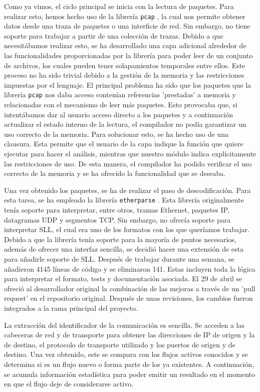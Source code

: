 \documentclass[10pt,a4paper,twoside]{article}
\begin{document}
\begin{multicols*}{2}
    Como ya vimos, el ciclo principal se inicia con la lectura de paquetes. Para realizar esto, hemos hecho uso de la librería \texttt{pcap} \cite{rustpcap}, la cual nos permite obtener datos desde una traza de paquetes o una interficie de red. Sin embargo, no tiene soporte para trabajar a partir de una colección de trazas. Debido a que necesitábamos realizar esto, se ha desarrollado una capa adicional alrededor de las funcionalidades proporcionadas por la librería para poder leer de un conjunto de archivos, los cuales pueden tener solapamientos temporales entre ellos. Este proceso no ha sido trivial debido a la gestión de la memoria y las restricciones impuestas por el lenguaje. El principal problema ha sido que los paquetes que la librería \texttt{pcap} nos daba acceso contenían referencias 'prestadas' a memoria y relacionadas con el mecanismo de leer más paquetes. Esto provocaba que, si intentábamos dar al usuario acceso directo a los paquetes y a continuación actualizar el estado interno de la lectura, el compilador no podía garantizar un uso correcto de la memoria. Para solucionar esto, se ha hecho uso de una clausura. Esta permite que el usuario de la capa indique la función que quiere ejecutar para hacer el análisis, mientras que nuestro módulo indica explícitamente las restricciones de uso. De esta manera, el compilador ha podido verificar el uso correcto de la memoria y se ha ofrecido la funcionalidad que se deseaba.

    Una vez obtenido los paquetes, se ha de realizar el paso de descodificación. Para esta tarea, se ha empleado la librería \texttt{etherparse} \cite{etherparse}. Esta librería originalmente tenía soporte para interpretar, entre otros, tramas Ethernet, paquetes IP, datagramas UDP y segmentos TCP. Sin embargo, no ofrecía soporte para interpretar SLL, el cual era uno de los formatos con los que queríamos trabajar. Debido a que la librería tenía soporte para la mayoría de puntos necesarios, además de  ofrecer una interfaz sencilla, se decidió hacer una extensión de esta para añadirle soporte de SLL. Después de trabajar durante una semana, se añadieron 4145 líneas de código y se eliminaron 141. Estas incluyen toda la lógica para interpretar el formato, tests y documentación asociada. El 29 de abril se ofreció al desarrollador original la combinación de las mejoras a través de un 'pull request' \cite{slladdsllpr} en el repositorio original. Después de unas revisiones, los cambios fueron integrados a la rama principal del proyecto.

    La extracción del identificador de la comunicación es sencilla. Se acceden a las cabeceras de red y de transporte para obtener las direcciones de IP de origen y la de destino, el protocolo de transporte utilizado y los puertos de origen y de destino. Una vez obtenido, este se compara con los flujos activos conocidos y se determina si es un flujo nuevo o forma parte de los ya existentes. A continuación, se acumula información estadística para poder emitir un resultado en el momento en que el flujo deje de considerarse activo.


\end{multicols*}
\end{document}
